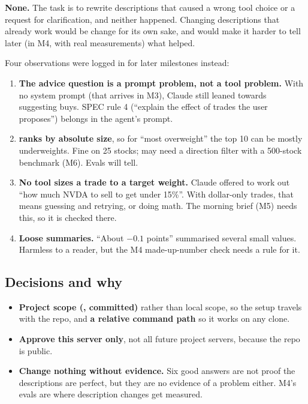 \documentclass[11pt]{article}
\newcommand{\code}[1]{\texttt{\detokenize{#1}}}
\begin{document}
\textbf{None.} The task is to rewrite descriptions that caused a wrong tool choice or a
request for clarification, and neither happened. Changing descriptions that already work
would be change for its own sake, and would make it harder to tell later (in M4, with real
measurements) what helped.

Four observations were logged in \code{docs/NOTES.md} for later milestones instead:

\begin{enumerate}
  \item \textbf{The advice question is a prompt problem, not a tool problem.} With no
        system prompt (that arrives in M3), Claude still leaned towards suggesting buys. SPEC
        rule 4 (``explain the effect of trades the user proposes'') belongs in the agent's
        prompt.
  \item \textbf{\code{top_n} ranks by absolute size}, so for ``most overweight'' the top 10
        can be mostly underweights. Fine on 25 stocks; may need a direction filter with a
        500-stock benchmark (M6). Evals will tell.
  \item \textbf{No tool sizes a trade to a target weight.} Claude offered to work out ``how
        much NVDA to sell to get under 15\%''. With dollar-only trades, that means guessing
        and retrying, or doing math. The morning brief (M5) needs this, so it is checked there.
  \item \textbf{Loose summaries.} ``About $-0.1$ points'' summarised several small values.
        Harmless to a reader, but the M4 made-up-number check needs a rule for it.
\end{enumerate}

\subsection{Decisions and why}

\begin{itemize}
  \item \textbf{Project scope (\code{.mcp.json}, committed)} rather than local scope, so the
        setup travels with the repo, and \textbf{a relative command path} so it works on
        any clone.
  \item \textbf{Approve this server only}, not all future project servers, because the repo
        is public.
  \item \textbf{Change nothing without evidence.} Six good answers are not proof the
        descriptions are perfect, but they are no evidence of a problem either. M4's evals
        are where description changes get measured.
\end{itemize}
\end{document}
